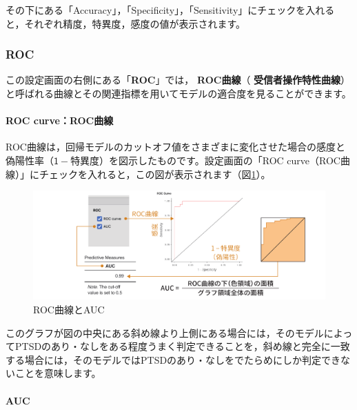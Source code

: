 \documentclass[
  12pt,
  a5jpaper,
  lualatex, ja=standard]{bxjsbook}
\renewcommand{\emph}[1]{\textbf{\color{emph} #1}}
\begin{document}
その下にある「Accuracy」，「Specificity」，「Sensitivity」にチェックを入れると，それぞれ精度，特異度，感度の値が表示されます。

\hypertarget{roc}{%
\subsubsection*{ROC}\label{roc}}

この設定画面の右側にある「\textbf{ROC}」では，\emph{ROC曲線}（\emph{受信者操作特性曲線}）と呼ばれる曲線とその関連指標を用いてモデルの適合度を見ることができます。

\hypertarget{roc-curverocux66f2ux7dda}{%
\paragraph*{ROC curve：ROC曲線}\label{roc-curverocux66f2ux7dda}}

ROC曲線は，回帰モデルのカットオフ値をさまざまに変化させた場合の感度と偽陽性率（\(\mathsf 1 -\)特異度）を図示したものです。設定画面の「ROC curve（ROC曲線）」にチェックを入れると，この図が表示されます（図\ref{fig:regression-binomial-auc}）。

\begin{figure}[!ht]

{\centering \includegraphics[width=1\linewidth]{images/regression/binomial-auc} 

}

\caption{ROC曲線とAUC}\label{fig:regression-binomial-auc}
\end{figure}

このグラフが図の中央にある斜め線より上側にある場合には，そのモデルによってPTSDのあり・なしをある程度うまく判定できることを，斜め線と完全に一致する場合には，そのモデルではPTSDのあり・なしをでたらめにしか判定できないことを意味します。

\hypertarget{auc}{%
\paragraph*{AUC}\label{auc}}
\end{document}
